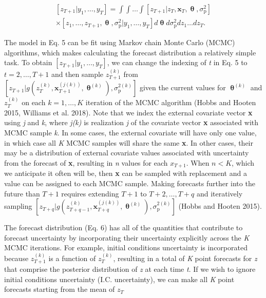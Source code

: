 \documentclass[12pt,]{article}
\begin{document}
\begin{equation}
\begin{gathered}
\left[z_{T+1} | y_1,\dots,y_T \right] = \int \int \dots \int \left[z_{T+1} | z_T, \textbf{x}_T, \bm{\uptheta}, \sigma^2_{\text{p}} \right] \\ \times \left[z_1,\dots,z_{T+1},\bm{\uptheta}, \sigma^2_{\text{p}} | y_1,\dots,y_T \right] d\bm{\uptheta} d\sigma^2_{\text{p}} dz_1 \dots dz_T.
\end{gathered}
\end{equation}

The model in Eq. 5 can be fit using Markov chain Monte Carlo (MCMC)
algorithms, which makes calculating the forecast distribution a
relatively simple task. To obtain
\(\left[z_{T+1} | y_1,\dots,y_T \right]\), we can change the indexing of
\emph{t} in Eq. 5 to \(t = 2,\dots,T+1\) and then sample
\(z_{T+1}^{(k)}\) from
\(\left[z_{T+1} | g(z_T^{(k)}, \textbf{x}_{T+1}^{(j(k))}, \bm{\uptheta}^{(k)}), \sigma^{2(k)}_{\text{p}} \right]\)
given the current values for \(\bm{\uptheta}^{(k)}\) and \(z_{T}^{(k)}\)
on each \(k = 1,\dots,K\) iteration of the MCMC algorithm (Hobbs and
Hooten 2015, Williams et al. 2018). Note that we index the external
covariate vector \textbf{x} using \emph{j} and \emph{k}, where
\emph{j(k)} is realization \emph{j} of the covariate vector \textbf{x}
associated with MCMC sample \emph{k}. In some cases, the external
covariate will have only one value, in which case all \emph{K} MCMC
samples will share the same \textbf{x}. In other cases, their may be a
distribution of external covariate values associated with uncertainty
from the forecast of \textbf{x}, resulting in \emph{n} values for each
\(x_{T+1}\). When \(n < K\), which we anticipate it often will be, then
\textbf{x} can be sampled with replacement and a value can be assigned
to each MCMC sample. Making forecasts further into the future than
\(T+1\) requires extending \(T+1\) to \(T+2,\dots,T+q\) and iteratively
sampling
\(\left[z_{T+q} | g(z_{T+q-1}^{(k)}, \textbf{x}_{T+q}^{(j(k))},\bm{\uptheta}^{(k)}), \sigma^{2(k)}_{\text{p}} \right]\)
(Hobbs and Hooten 2015).

The forecast distribution (Eq. 6) has all of the quantities that
contribute to forecast uncertainty by incorporating their uncertainty
explicitly across the \emph{K} MCMC iterations. For example, initial
conditions uncertainty is incorporated because \(z_{T+1}^{(k)}\) is a
function of \(z_{T}^{(k)}\), resulting in a total of \emph{K} point
forecasts for \emph{z} that comprise the posterior distribution of
\emph{z} at each time \emph{t}. If we wish to ignore initial conditions
uncertainty (I.C. uncertainty), we can make all \emph{K} point forecasts
starting from the mean of \(z_{T}\)
\end{document}
